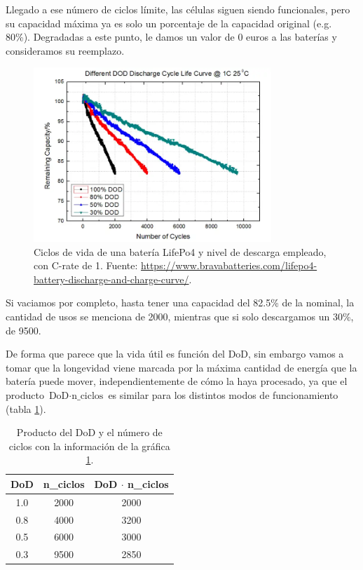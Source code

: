 Llegado a ese número de ciclos límite, las células siguen siendo funcionales,
pero su capacidad máxima ya es solo un porcentaje de la capacidad original
(e.g. 80\%). Degradadas a este punto, le damos un valor de 0 euros a las
baterías y consideramos su reemplazo.

\begin{figure}[h] \centering
	\centering
	\includegraphics[width=0.8\textwidth]{./capitulos/resultados_discusion/images/dod_vs_cycles_lifepo4.png}
	\caption{Ciclos de vida de una batería LifePo4 y nivel de descarga empleado,
		con C-rate de 1. Fuente:
		\url{https://www.bravabatteries.com/lifepo4-battery-discharge-and-charge-curve/}.}
	\label{fig:dod_vs_cycles_lifepo4}
\end{figure}

Si vaciamos por completo, hasta tener una capacidad del 82.5\% de la nominal,
la cantidad de usos se menciona de 2000, mientras que si solo descargamos un
30\%, de 9500.

De forma que parece que la vida útil es función del DoD, sin embargo vamos a
tomar que la longevidad viene marcada por la máxima cantidad de energía que la
batería puede mover, independientemente de cómo la haya procesado, ya que el
producto $\text{DoD} \cdot \text{n\_ciclos}$ es similar para los distintos
modos de funcionamiento (tabla \ref{tab:DoD_results}).

\begin{table}[h]
	\centering
	\begin{tabular}{ccc}
		\toprule
		\textbf{DoD} & \textbf{n\_ciclos} & \textbf{DoD} $\cdot$ \textbf{n\_ciclos} \\
		\midrule
		1.0          & 2000               & 2000                                    \\
		0.8          & 4000               & 3200                                    \\
		0.5          & 6000               & 3000                                    \\
		0.3          & 9500               & 2850                                    \\
		\bottomrule
	\end{tabular}
	\caption{Producto del DoD y el número de ciclos con la información de la
		gráfica \ref{fig:dod_vs_cycles_lifepo4}.}
	\label{tab:DoD_results}
\end{table}


